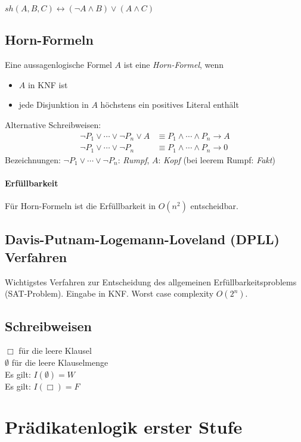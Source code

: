 \documentclass{article}
\begin{document}
$sh(A, B, C) \leftrightarrow (\lnot A \land B) \lor (A \land C)$

\subsection{Horn-Formeln}
Eine aussagenlogische Formel $A$ ist eine \textit{Horn-Formel}, wenn
\begin{itemize}
    \item $A$ in KNF ist
    \item jede Disjunktion in $A$ h\"ochstens ein positives Literal enth\"alt
\end{itemize}
Alternative Schreibweisen:
\begin{align*}
    \lnot P_1 \lor \cdots \lor \lnot P_n \lor A &\equiv
P_1 \land \cdots \land P_n \rightarrow A \\
    \lnot P_1 \lor \cdots \lor \lnot P_n &\equiv
P_1 \land \cdots \land P_n \rightarrow 0
\end{align*}
Bezeichnungen: $\lnot P_1 \lor \cdots \lor \lnot P_n$: \textit{Rumpf},
\qquad $A$: \textit{Kopf} (bei leerem Rumpf: \textit{Fakt})

\paragraph{Erf\"ullbarkeit} 
F\"ur Horn-Formeln ist die Erf\"ullbarkeit in 
$O(n^2)$ entscheidbar.

\subsection{Davis-Putnam-Logemann-Loveland (DPLL) Verfahren}
Wichtigstes Verfahren zur Entscheidung des allgemeinen Erf\"ullbarkeitsproblems (SAT-Problem). Eingabe in KNF. Worst case complexity $O(2^n)$.


\subsection{Schreibweisen}
$\Box$ f\"ur die leere Klausel \\
$\emptyset$ f\"ur die leere Klauselmenge \\
Es gilt: $I(\emptyset) = W$ \\
Es gilt: $I(\Box) = F$ \\

\section{Pr\"adikatenlogik erster Stufe}
\end{document}
